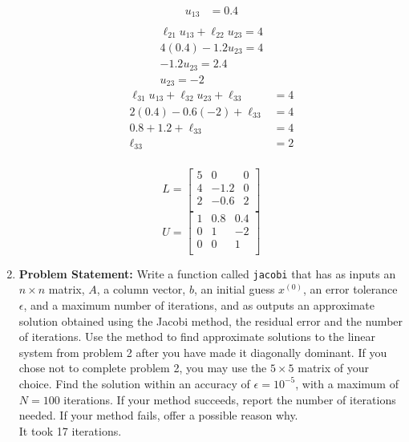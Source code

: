 \documentclass[12pt,twoside]{amsart}
\begin{document}
\begin{enumerate}
\begin{paracol}{2}
\begin{align*}
            u_{13} & = 0.4 \\
        \end{align*}
        \begin{align*}
            \ell_{21}u_{13} + \ell_{22}u_{23} = 4 \\
            4(0.4) - 1.2u_{23} = 4 \\
            -1.2u_{23} = 2.4 \\
            u_{23} = -2
        \end{align*}
        \begin{align*}
            \ell_{31}u_{13} + \ell_{32}u_{23} + \ell_{33} & = 4 \\
            2(0.4) - 0.6(-2) + \ell_{33} & = 4 \\
            0.8 + 1.2 + \ell_{33} & = 4 \\
            \ell_{33} & = 2 \\
        \end{align*}
    \end{paracol}
    \begin{paracol}{2}
        $$L = \left[\begin{array}{ccc}
            5 & 0 & 0 \\
            4 & -1.2 & 0 \\
            2 & -0.6 & 2 \\
        \end{array}\right]$$
    \switchcolumn
        $$U = \left[\begin{array}{ccc}
            1 & 0.8 & 0.4 \\
            0 & 1 & -2 \\
            0 & 0 & 1 \\
        \end{array}\right]$$
    \end{paracol}
    \bigskip

    \item \textbf{Problem Statement:} Write a function called \texttt{jacobi} that has as inputs an $n\times n$ matrix, $A$, a column vector, $b$, an initial guess $x^(0)$, an error tolerance $\epsilon$, and a maximum number of iterations, and as outputs an approximate solution obtained using the Jacobi method, the residual error and the number of iterations. Use the method to find approximate solutions to the linear system from problem 2 after you have made it diagonally dominant. If you chose not to complete problem 2, you may use the $5\times5$ matrix of your choice. Find the solution within an accuracy of $\epsilon = 10^{-5}$, with a maximum of $N = 100$ iterations. If your method succeeds, report the number of iterations needed. If your method fails, offer a possible reason why. \\
    
    It took 17 iterations. \\
    \bigskip


\end{enumerate}
\end{document}
